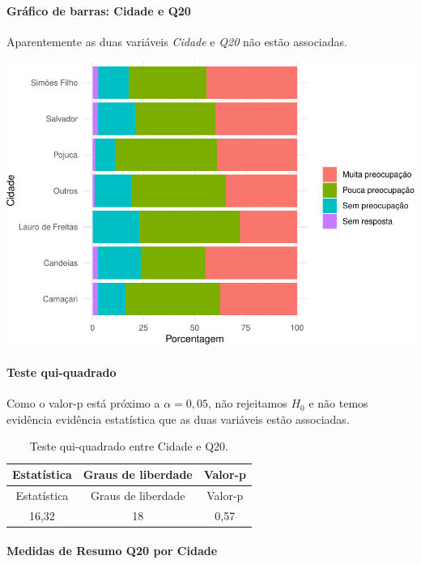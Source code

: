\documentclass[]{article}
\let\oldparagraph\paragraph
\renewcommand{\paragraph}[1]{\oldparagraph{#1}\mbox{}}
\begin{document}
\hypertarget{gruxe1fico-de-barras-cidade-e-q20}{%
\paragraph{Gráfico de barras: Cidade e Q20}\label{gruxe1fico-de-barras-cidade-e-q20}}

Aparentemente as duas variáveis \emph{Cidade} e \emph{Q20} não estão associadas.

\begin{center}\includegraphics[width=0.75\linewidth]{relatorio_files/figure-latex/unnamed-chunk-289-1} \end{center}

\hypertarget{teste-qui-quadrado-32}{%
\paragraph{Teste qui-quadrado}\label{teste-qui-quadrado-32}}

Como o valor-p está próximo a \(\alpha=0,05\), não rejeitamos \(H_0\) e não temos evidência evidência estatística que as duas variáveis estão associadas.

\begin{longtable}[]{@{}ccc@{}}
\caption{\label{tab:unnamed-chunk-290}Teste qui-quadrado entre Cidade e Q20.}\tabularnewline
\toprule
Estatística & Graus de liberdade & Valor-p\tabularnewline
\midrule
\endfirsthead
\toprule
Estatística & Graus de liberdade & Valor-p\tabularnewline
\midrule
\endhead
16,32 & 18 & 0,57\tabularnewline
\bottomrule
\end{longtable}

\cleardoublepage

\hypertarget{medidas-de-resumo-q20-por-cidade}{%
\paragraph{Medidas de Resumo Q20 por Cidade}\label{medidas-de-resumo-q20-por-cidade}}
\end{document}
